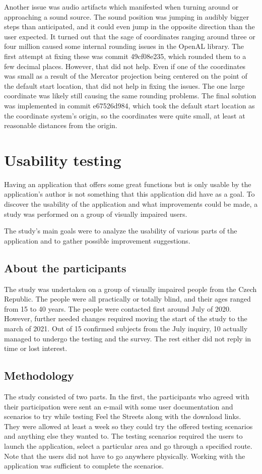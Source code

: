 \documentclass[nolof,digital]{fithesis3}
\begin{document}
Another issue was audio artifacts which manifested when turning around or approaching a sound source. The sound position was jumping in audibly bigger steps than anticipated, and it could even jump in the opposite direction than the user expected. It turned out that the sage of coordinates ranging around three or four million caused some internal rounding issues in the OpenAL library. The first attempt at fixing these was commit 49cf08e235, which rounded them to a few decimal places. However, that did not help. Even if one of the coordinates was small as a result of the Mercator projection being centered on the point of the default start location, that did not help in fixing the issues. The one large coordinate was likely still causing the same rounding problems. The final solution was implemented in commit e67526d984, which took the default start location as the coordinate system's origin, so the coordinates were quite small, at least at reasonable distances from the origin.
\chapter{Usability testing}
Having an application that offers some great functions but is only usable by the application's author is not something that this application did have as a goal. To discover the usability of the application and what improvements could be made, a study was performed on a group of visually impaired users.

The study's main goals were to analyze the usability of various parts of the application and to gather possible improvement suggestions.
\section{About the participants}
The study was undertaken on a group of visually impaired people from the Czech Republic. The people were all practically or totally blind, and their ages ranged from 15 to 40 years. The people were contacted first around July of 2020. However, further needed changes required moving the start of the study to the march of 2021. Out of 15 confirmed subjects from the July inquiry, 10 actually managed to undergo the testing and the survey. The rest either did not reply in time or lost interest.
\section{Methodology}
The study consisted of two parts. In the first, the participants who agreed with their participation were sent an e-mail with some user documentation and scenarios to try while testing Feel the Streets along with the download links. They were allowed at least a week so they could try the offered testing scenarios and anything else they wanted to. The testing scenarios required the users to launch the application, select a particular area and go through a specified route. Note that the users did not have to go anywhere physically. Working with the application was sufficient to complete the scenarios.
\end{document}

